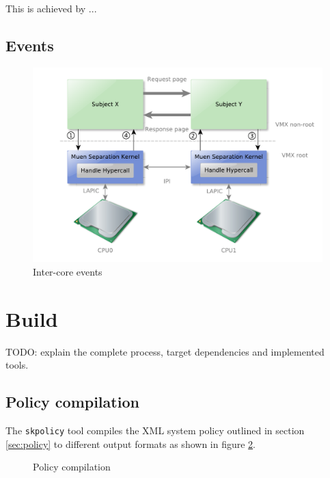 This is achieved by ...

\subsection{Events}
\begin{figure}[h]
	\centering
	\includegraphics[width=\textwidth]{images/inter-core-events}
	\caption{Inter-core events}
	\label{fig:inter-core-events}
\end{figure}

\section{Build}
TODO: explain the complete process, target dependencies and implemented tools.

\subsection{Policy compilation}
The \texttt{skpolicy} tool compiles the XML system policy outlined in section
\ref{sec:policy} to different output formats as shown in figure
\ref{fig:policy-compilation}.

\begin{figure}[h]
	\centering
	\caption{Policy compilation}
	\label{fig:policy-compilation}
\end{figure}


